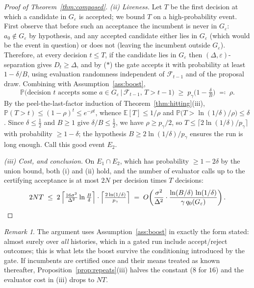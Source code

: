 \documentclass{article}
\theoremstyle{plain}
\theoremstyle{definition}
\theoremstyle{remark}
\newtheorem{remark}[theorem]{Remark}
\newcommand{\E}{\mathbb{E}}
\renewcommand{\P}{\mathbb{P}}
\newcommand{\eps}{\varepsilon}
\newcommand{\pgam}{p_{\gamma}}
\begin{document}
\begin{proof}[Proof of Theorem~\ref{thm:composed}]
\emph{(ii) Liveness.} Let $T$ be the first decision at which a candidate in $G_\eps$ is accepted; we bound $T$ on a high-probability event. First observe that before such an acceptance the incumbent is never in $G_\eps$: $a_0 \notin G_\eps$ by hypothesis, and any accepted candidate either lies in $G_\eps$ (which would be the event in question) or does not (leaving the incumbent outside $G_\eps$). Therefore, at every decision $t \le T$, if the candidate lies in $G_\eps$ then $(\Delta,\eps)$-separation gives $D_t \ge \Delta$, and by ($\ast$) the gate accepts it with probability at least $1 - \delta/B$, using evaluation randomness independent of $\mathcal{F}_{t-1}$ and of the proposal draw. Combining with Assumption~\ref{ass:boost},
\[
\P\big(\text{decision } t \text{ accepts some } a \in G_\eps \,\big|\, \mathcal{F}_{t-1},\, T > t-1\big)
\;\ge\; \pgam \big(1 - \tfrac{\delta}{B}\big) \;\eqqcolon\; \rho .
\]
By the peel-the-last-factor induction of Theorem~\ref{thm:hitting}(iii), $\P(T > t) \le (1-\rho)^t \le e^{-\rho t}$, whence $\E[T] \le 1/\rho$ and $\P\big(T > \ln(1/\delta)/\rho\big) \le \delta$. Since $\delta \le \tfrac12$ and $B \ge 1$ give $\delta/B \le \tfrac12$, we have $\rho \ge \pgam/2$, so $T \le \lceil 2\ln(1/\delta)/\pgam \rceil$ with probability $\ge 1 - \delta$; the hypothesis $B \ge 2\ln(1/\delta)/\pgam$ ensures the run is long enough. Call this good event $E_2$.

\emph{(iii) Cost, and conclusion.} On $E_1 \cap E_2$, which has probability $\ge 1 - 2\delta$ by the union bound, both (i) and (ii) hold, and the number of evaluator calls up to the certifying acceptance is at most $2N$ per decision times $T$ decisions:
\[
2NT \;\le\; 2\,\Big\lceil \tfrac{16\sigma^2}{\Delta^2}\ln\tfrac{B}{\delta} \Big\rceil \cdot \Big\lceil \tfrac{2\ln(1/\delta)}{\pgam} \Big\rceil
\;=\; O\!\left( \frac{\sigma^2}{\Delta^2} \cdot \frac{\ln(B/\delta)\,\ln(1/\delta)}{\gamma\, q_0(G_\eps)} \right). \qedhere
\]
\end{proof}

\begin{remark}
The argument uses Assumption~\ref{ass:boost} in exactly the form stated: almost surely over \emph{all} histories, which in a gated run include accept/reject outcomes; this is what lets the boost survive the conditioning introduced by the gate. If incumbents are certified once and their means treated as known thereafter, Proposition~\ref{prop:repeats}(iii) halves the constant ($8$ for $16$) and the evaluator cost in (iii) drops to $NT$.
\end{remark}
\end{document}
